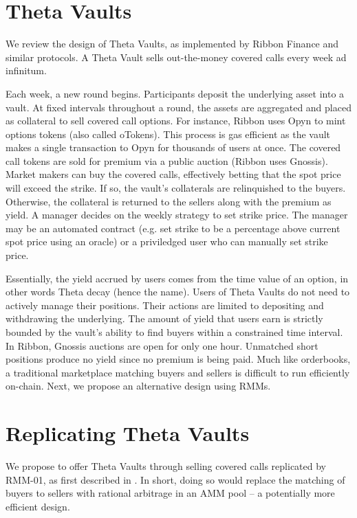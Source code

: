 \documentclass[hidelinks, 12pt]{article}
\begin{document}
\section{Theta Vaults}
\label{sec:theta}

We review the design of Theta Vaults, as implemented by Ribbon Finance and similar protocols. A Theta Vault sells out-the-money covered calls every week ad infinitum.

Each week, a new round begins. Participants deposit the underlying asset into a vault. At fixed intervals throughout a round, the assets are aggregated and placed as collateral to sell covered call options. For instance, Ribbon uses Opyn to mint options tokens (also called oTokens). This process is gas efficient as the vault makes a single transaction to Opyn for thousands of users at once. The covered call tokens are sold for premium via a public auction (Ribbon uses Gnossis). Market makers can buy the covered calls, effectively betting that the spot price will exceed the strike. If so, the vault's collaterals are relinquished to the buyers. Otherwise, the collateral is returned to the sellers along with the premium as yield.
A manager decides on the weekly strategy to set strike price. The manager may be an automated contract (e.g. set strike to be a percentage above current spot price using an oracle) or a priviledged user who can manually set strike price.

Essentially, the yield accrued by users comes from the time value of an option, in other words Theta decay (hence the name). Users of Theta Vaults do not need to actively manage their positions. Their actions are limited to depositing and withdrawing the underlying. The amount of yield that users earn is strictly bounded by the vault's ability to find buyers within a constrained time interval. In Ribbon, Gnossis auctions are open for only one hour. Unmatched short positions produce no yield since no premium is being paid. Much like orderbooks, a traditional marketplace matching buyers and sellers is difficult to run efficiently on-chain. Next, we propose an alternative design using RMMs.

\section{Replicating Theta Vaults}

We propose to offer Theta Vaults through selling covered calls replicated by RMM-01, as first described in \cite{sterrett2022replicating}. In short, doing so would replace the matching of buyers to sellers with rational arbitrage in an AMM pool -- a potentially more efficient design.
\end{document}
